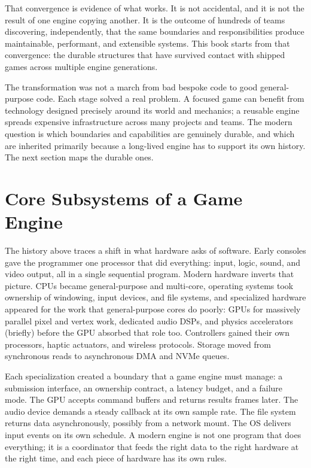 \documentclass[
  11pt,
  letterpaper,
  DIV=11,
  numbers=noendperiod,
  twoside,
  open=right]{scrreprt}
\begin{document}
That convergence is evidence of what works. It is not accidental, and it
is not the result of one engine copying another. It is the outcome of
hundreds of teams discovering, independently, that the same boundaries
and responsibilities produce maintainable, performant, and extensible
systems. This book starts from that convergence: the durable structures
that have survived contact with shipped games across multiple engine
generations.

The transformation was not a march from bad bespoke code to good
general-purpose code. Each stage solved a real problem. A focused game
can benefit from technology designed precisely around its world and
mechanics; a reusable engine spreads expensive infrastructure across
many projects and teams. The modern question is which boundaries and
capabilities are genuinely durable, and which are inherited primarily
because a long-lived engine has to support its own history. The next
section maps the durable ones.

\section{Core Subsystems of a Game
Engine}\label{core-subsystems-of-a-game-engine}

The history above traces a shift in what hardware asks of software.
Early consoles gave the programmer one processor that did everything:
input, logic, sound, and video output, all in a single sequential
program. Modern hardware inverts that picture. CPUs became
general-purpose and multi-core, operating systems took ownership of
windowing, input devices, and file systems, and specialized hardware
appeared for the work that general-purpose cores do poorly: GPUs for
massively parallel pixel and vertex work, dedicated audio DSPs, and
physics accelerators (briefly) before the GPU absorbed that role too.
Controllers gained their own processors, haptic actuators, and wireless
protocols. Storage moved from synchronous reads to asynchronous DMA and
NVMe queues.

Each specialization created a boundary that a game engine must manage: a
submission interface, an ownership contract, a latency budget, and a
failure mode. The GPU accepts command buffers and returns results frames
later. The audio device demands a steady callback at its own sample
rate. The file system returns data asynchronously, possibly from a
network mount. The OS delivers input events on its own schedule. A
modern engine is not one program that does everything; it is a
coordinator that feeds the right data to the right hardware at the right
time, and each piece of hardware has its own rules.
\end{document}
